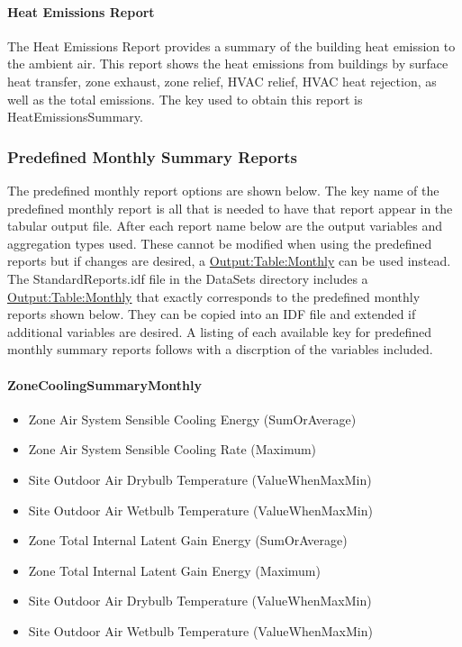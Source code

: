 \paragraph{Heat Emissions Report}\label{HeatEmissionsReport}

The Heat Emissions Report provides a summary of the building heat emission to the ambient air. This report shows the heat emissions from buildings by surface heat transfer, zone exhaust, zone relief, HVAC relief, HVAC heat rejection, as well as the total emissions. The key used to obtain this report is HeatEmissionsSummary.


\subsubsection{Predefined Monthly Summary Reports}\label{predefined-monthly-summary-reports}

The predefined monthly report options are shown below. The key name of the predefined monthly report is all that is needed to have that report appear in the tabular output file. After each report name below are the output variables and aggregation types used. These cannot be modified when using the predefined reports but if changes are desired, a \hyperref[outputtablemonthly]{Output:Table:Monthly} can be used instead. The StandardReports.idf file in the DataSets directory includes a \hyperref[outputtablemonthly]{Output:Table:Monthly} that exactly corresponds to the predefined monthly reports shown below. They can be copied into an IDF file and extended if additional variables are desired. A listing of each available key for predefined monthly summary reports follows with a discrption of the variables included.

\paragraph{ZoneCoolingSummaryMonthly}\label{zonecoolingsummarymonthly}

\begin{itemize}
\item
  Zone Air System Sensible Cooling Energy (SumOrAverage)
\item
  Zone Air System Sensible Cooling Rate (Maximum)
\item
  Site Outdoor Air Drybulb Temperature (ValueWhenMaxMin)
\item
  Site Outdoor Air Wetbulb Temperature (ValueWhenMaxMin)
\item
  Zone Total Internal Latent Gain Energy (SumOrAverage)
\item
  Zone Total Internal Latent Gain Energy (Maximum)
\item
  Site Outdoor Air Drybulb Temperature (ValueWhenMaxMin)
\item
  Site Outdoor Air Wetbulb Temperature (ValueWhenMaxMin)
\end{itemize}

